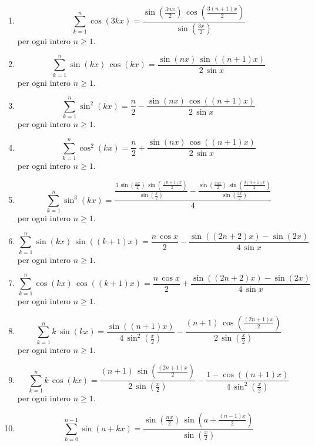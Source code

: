 \documentclass[11pt,a4paper]{article}
\begin{document}
\begin{enumerate}
{\small per ogni intero $n\ge 1$.}
\item \[ \sum_{k=1}^{n} \cos\left(3k x\right) = \frac{\sin\left(\frac{3n x}{2}\right)\,\cos\left(\frac{3\left(n + 1\right)x}{2}\right)}{\sin\left(\frac{3x}{2}\right)} \]
{\small per ogni intero $n\ge 1$.}
\item \[ \sum_{k=1}^{n} \sin\left(k x\right)\,\cos\left(k x\right) = \frac{\sin\left(n x\right)\,\sin\left(\left(n + 1\right)x\right)}{2\,\sin x} \]
{\small per ogni intero $n\ge 1$.}
\item \[ \sum_{k=1}^{n} \sin^{2}\left(k x\right) = \frac{n}{2} - \frac{\sin\left(n x\right)\,\cos\left(\left(n + 1\right)x\right)}{2\,\sin x} \]
{\small per ogni intero $n\ge 1$.}
\item \[ \sum_{k=1}^{n} \cos^{2}\left(k x\right) = \frac{n}{2} + \frac{\sin\left(n x\right)\,\cos\left(\left(n + 1\right)x\right)}{2\,\sin x} \]
{\small per ogni intero $n\ge 1$.}
\item \[ \sum_{k=1}^{n} \sin^{3}\left(k x\right) = \frac{\frac{3\,\sin\left(\frac{n x}{2}\right)\,\sin\left(\frac{\left(n + 1\right)x}{2}\right)}{\sin\left(\frac{x}{2}\right)} - \frac{\sin\left(\frac{3n x}{2}\right)\,\sin\left(\frac{3\left(n + 1\right)x}{2}\right)}{\sin\left(\frac{3x}{2}\right)}}{4} \]
{\small per ogni intero $n\ge 1$.}
\item \[ \sum_{k=1}^{n} \sin\left(k x\right)\,\sin\left(\left(k + 1\right)x\right) = \frac{n\,\cos x}{2} - \frac{\sin\left(\left(2n + 2\right)x\right) - \sin\left(2x\right)}{4\,\sin x} \]
{\small per ogni intero $n\ge 1$.}
\item \[ \sum_{k=1}^{n} \cos\left(k x\right)\,\cos\left(\left(k + 1\right)x\right) = \frac{n\,\cos x}{2} + \frac{\sin\left(\left(2n + 2\right)x\right) - \sin\left(2x\right)}{4\,\sin x} \]
{\small per ogni intero $n\ge 1$.}
\item \[ \sum_{k=1}^{n} k\,\sin\left(k x\right) = \frac{\sin\left(\left(n + 1\right)x\right)}{4\,\sin^{2}\left(\frac{x}{2}\right)} - \frac{\left(n + 1\right)\,\cos\left(\frac{\left(2n + 1\right)x}{2}\right)}{2\,\sin\left(\frac{x}{2}\right)} \]
{\small per ogni intero $n\ge 1$.}
\item \[ \sum_{k=1}^{n} k\,\cos\left(k x\right) = \frac{\left(n + 1\right)\,\sin\left(\frac{\left(2n + 1\right)x}{2}\right)}{2\,\sin\left(\frac{x}{2}\right)} - \frac{1 - \cos\left(\left(n + 1\right)x\right)}{4\,\sin^{2}\left(\frac{x}{2}\right)} \]
{\small per ogni intero $n\ge 1$.}
\item \[ \sum_{k=0}^{n - 1} \sin\left(a + k x\right) = \frac{\sin\left(\frac{n x}{2}\right)\,\sin\left(a + \frac{\left(n - 1\right)x}{2}\right)}{\sin\left(\frac{x}{2}\right)} \]

\end{enumerate}
\end{document}
